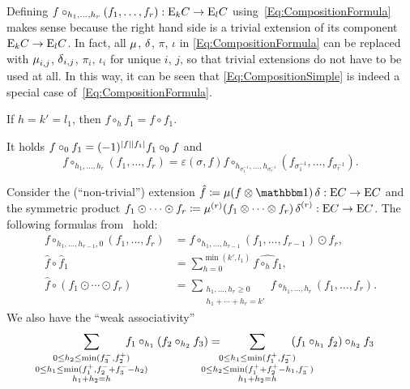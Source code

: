 \documentclass[\MainFolder/Text.tex]{subfiles}
\begin{document}
\begin{Remark}\label{Rem:Compositions}
\begin{RemarkList}
\item Defining $f\circ_{h_1, \dotsc, h_r}(f_1, \dotsc, f_r): \mathrm{E}_k C \rightarrow \mathrm{E}_l C$ using~\eqref{Eq:CompositionFormula} makes sense because the right hand side is a trivial extension of its component $\mathrm{E}_k C \rightarrow \mathrm{E}_l C$. In fact, all $\operatorname{\mu}$, $\operatorname{\delta}$, $\pi$, $\iota$ in \eqref{Eq:CompositionFormula} can be replaced with $\operatorname{\mu}_{i,j}$, $\operatorname{\delta}_{i,j}$, $\pi_i$, $\iota_i$ for unique $i$, $j$, so that trivial extensions do not have to be used at all. In this way, it can be seen that \eqref{Eq:CompositionSimple} is indeed a special case of~\eqref{Eq:CompositionFormula}. 
\item If $h = k' = l_1$, then $f \circ_{h} f_1 = f\circ f_1$.
\item It holds $f \circ_0 f_1 = (-1)^{|f||f_1|} f_1 \circ_0 f$ and 
$$ f\circ_{h_1,\dotsc,h_r}(f_1,\dotsc,f_r) = \varepsilon(\sigma,f) f\circ_{h_{\sigma_1^{-1}},\dotsc,h_{\sigma_r^{-1}}}(f_{\sigma_1^{-1}},\dotsc,f_{\sigma_r^{-1}}). $$
\item Consider the (``non-trivial'') extension $\hat{f}\coloneqq \Prod(f\otimes \Id)\CoProd: \Ext C \rightarrow \Ext C$ and the symmetric product $f_1 \odot \dotsb \odot f_r \coloneqq \operatorname{\mu}^{(r)}(f_1 \otimes \dotsb \otimes f_r)\operatorname{\delta}^{(r)}: \mathrm{E} C \rightarrow \mathrm{E} C$. The following formulas from~\cite{Cieliebak2015} hold:
\begin{equation} \label{Eq:Mix}
\begin{aligned}
f\circ_{h_1,\dotsc,h_{r-1},0}(f_1,\dotsc, f_r) &= f\circ_{h_1,\dotsc, h_{r-1}}(f_1,\dotsc, f_{r-1}) \odot f_r, \\
\hat{f} \circ \hat{f}_1 &= \sum_{h = 0}^{\min(k',l_1)} \widehat{f\circ_h f_1}, \\ 
   \hat{f} \circ (f_1 \odot \dotsb \odot f_r) &= \sum_{\substack{h_1, \dotsc, h_r \ge 0 \\ h_1 + \dotsb + h_r = k'}} f\circ_{h_1,\dotsc, h_r}(f_1,\dotsc, f_r).
\end{aligned}
\end{equation}
We also have the ``weak associativity''
\begin{equation}\label{Eq:WeakAssoc}
\qquad\qquad \mathclap{\sum_{\substack{0 \le h_2 \le \min(f_3^-, f_2^+) \\
0 \le h_1 \le \min(f_1^+,f_2^- + f_3^- - h_2) \\
h_1 + h_2 = h}}}\quad\qquad f_1 \circ_{h_1} (f_2 \circ_{h_2} f_3) = \qquad\quad \mathclap{\sum_{\substack{0 \le h_1 \le \min(f_1^+,f_2^-) \\ 0 \le h_2 \le \min(f_1^+ + f_2^+ - h_1, f_3^-) \\ h_1 + h_2 = h}}}\qquad\quad (f_1 \circ_{h_1} f_2) \circ_{h_2} f_3

\end{equation}
\end{RemarkList}
\end{Remark}
\end{document}
